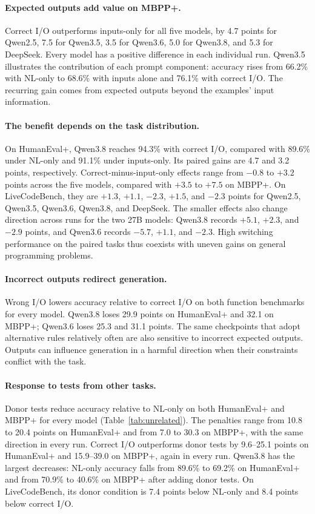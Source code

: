 \documentclass[acmsmall,screen,review,anonymous]{acmart}
\begin{document}
\paragraph{Expected outputs add value on MBPP+.}
Correct I/O outperforms inputs-only for all five models, by 4.7 points for Qwen2.5, 7.5 for Qwen3.5, 3.5 for Qwen3.6, 5.0 for Qwen3.8, and 5.3 for DeepSeek.
Every model has a positive difference in each individual run.
Qwen3.5 illustrates the contribution of each prompt component: accuracy rises from 66.2\% with NL-only to 68.6\% with inputs alone and 76.1\% with correct I/O.
The recurring gain comes from expected outputs beyond the examples' input information.

\paragraph{The benefit depends on the task distribution.}
On HumanEval+, Qwen3.8 reaches 94.3\% with correct I/O, compared with 89.6\% under NL-only and 91.1\% under inputs-only.
Its paired gains are 4.7 and 3.2 points, respectively.
Correct-minus-input-only effects range from $-0.8$ to $+3.2$ points across the five models, compared with $+3.5$ to $+7.5$ on MBPP+.
On LiveCodeBench, they are $+1.3$, $+1.1$, $-2.3$, $+1.5$, and $-2.3$ points for Qwen2.5, Qwen3.5, Qwen3.6, Qwen3.8, and DeepSeek.
The smaller effects also change direction across runs for the two 27B models: Qwen3.8 records $+5.1$, $+2.3$, and $-2.9$ points, and Qwen3.6 records $-5.7$, $+1.1$, and $-2.3$.
High switching performance on the paired tasks thus coexists with uneven gains on general programming problems.

\paragraph{Incorrect outputs redirect generation.}
Wrong I/O lowers accuracy relative to correct I/O on both function benchmarks for every model.
Qwen3.8 loses 29.9 points on HumanEval+ and 32.1 on MBPP+; Qwen3.6 loses 25.3 and 31.1 points.
The same checkpoints that adopt alternative rules relatively often are also sensitive to incorrect expected outputs.
Outputs can influence generation in a harmful direction when their constraints conflict with the task.




\paragraph{Response to tests from other tasks.}
Donor tests reduce accuracy relative to NL-only on both HumanEval+ and MBPP+ for every model (Table~\ref{tab:unrelated}).
The penalties range from 10.8 to 20.4 points on HumanEval+ and from 7.0 to 30.3 on MBPP+, with the same direction in every run.
Correct I/O outperforms donor tests by 9.6--25.1 points on HumanEval+ and 15.9--39.0 on MBPP+, again in every run.
Qwen3.8 has the largest decreases: NL-only accuracy falls from 89.6\% to 69.2\% on HumanEval+ and from 70.9\% to 40.6\% on MBPP+ after adding donor tests.
On LiveCodeBench, its donor condition is 7.4 points below NL-only and 8.4 points below correct I/O.
\end{document}
